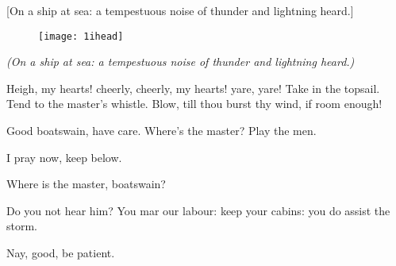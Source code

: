 
[On a ship at sea: a tempestuous noise of thunder and lightning heard.]

\begin{figure}[t]
	\centering
	\texttt{[image: 1ihead]}
\end{figure}

\begin{letter}

\end{letter}

\vspace{\textsink}

\textit{(On a ship at sea: a tempestuous noise of thunder and lightning heard.)}\centering
{}


\begin{prose_speech}[Boatswain] Heigh, my hearts! cheerly, cheerly, my hearts! yare, yare! Take in the topsail. Tend to the master's whistle. Blow, till thou burst thy wind, if room enough!
\end{prose_speech}


\begin{prose_speech}[Alonso] Good boatswain, have care. Where's the master? Play the men.
\end{prose_speech}


\begin{prose_speech}[Boatswain] I pray now, keep below.\end{prose_speech}

\begin{prose_speech}[Antonio] Where is the master, boatswain?\end{prose_speech}

\begin{prose_speech}[Boatswain] Do you not hear him? You mar our labour: keep your cabins: you do assist the storm.
\end{prose_speech}

\begin{prose_speech}[Gonzalo] Nay, good, be patient.\end{prose_speech}

